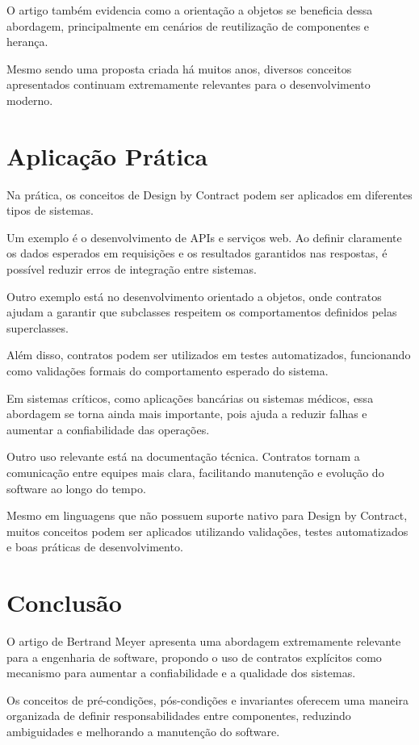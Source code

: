 \documentclass[conference]{IEEEtran}
\begin{document}
O artigo também evidencia como a orientação a objetos se beneficia dessa abordagem, principalmente em cenários de reutilização de componentes e herança.

Mesmo sendo uma proposta criada há muitos anos, diversos conceitos apresentados continuam extremamente relevantes para o desenvolvimento moderno.

\section{Aplicação Prática}

Na prática, os conceitos de Design by Contract podem ser aplicados em diferentes tipos de sistemas.

Um exemplo é o desenvolvimento de APIs e serviços web. Ao definir claramente os dados esperados em requisições e os resultados garantidos nas respostas, é possível reduzir erros de integração entre sistemas.

Outro exemplo está no desenvolvimento orientado a objetos, onde contratos ajudam a garantir que subclasses respeitem os comportamentos definidos pelas superclasses.

Além disso, contratos podem ser utilizados em testes automatizados, funcionando como validações formais do comportamento esperado do sistema.

Em sistemas críticos, como aplicações bancárias ou sistemas médicos, essa abordagem se torna ainda mais importante, pois ajuda a reduzir falhas e aumentar a confiabilidade das operações.

Outro uso relevante está na documentação técnica. Contratos tornam a comunicação entre equipes mais clara, facilitando manutenção e evolução do software ao longo do tempo.

Mesmo em linguagens que não possuem suporte nativo para Design by Contract, muitos conceitos podem ser aplicados utilizando validações, testes automatizados e boas práticas de desenvolvimento.

\section{Conclusão}

O artigo de Bertrand Meyer apresenta uma abordagem extremamente relevante para a engenharia de software, propondo o uso de contratos explícitos como mecanismo para aumentar a confiabilidade e a qualidade dos sistemas.

Os conceitos de pré-condições, pós-condições e invariantes oferecem uma maneira organizada de definir responsabilidades entre componentes, reduzindo ambiguidades e melhorando a manutenção do software.
\end{document}

